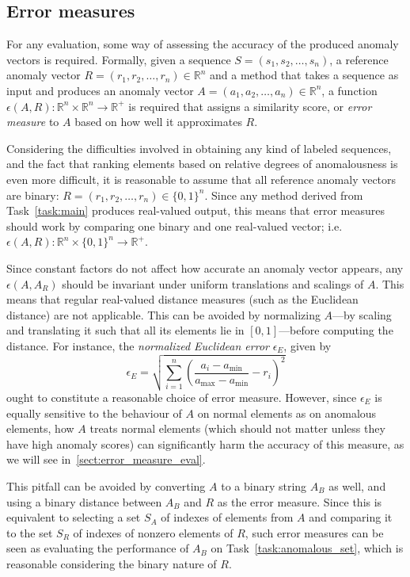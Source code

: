 \subsection{Error measures}
\label{sect:evaluation_measures}

For any evaluation, some way of assessing the accuracy of the produced anomaly vectors is required. Formally, given a sequence $S = (s_1, s_2, \dots, s_n)$, a reference anomaly vector $R = (r_1, r_2, \dots, r_n) \in \mathbb{R}^{n}$ and a method that takes a sequence as input and produces an anomaly vector $A = (a_1, a_2, \dots, a_n) \in \mathbb{R}^{n}$, a function $\epsilon(A, R): \mathbb{R}^n \times \mathbb{R}^n \rightarrow \mathbb{R}^+$ is required that assigns a similarity score, or \emph{error measure} to $A$ based on how well it approximates $R$.

Considering the difficulties involved in obtaining any kind of labeled sequences, and the fact that ranking elements based on relative degrees of anomalousness is even more difficult, it is reasonable to assume that all reference anomaly vectors are binary: $R = (r_1, r_2, \dots, r_n) \in {\{0,1\}}^n$. Since any method derived from Task~\ref{task:main} produces real-valued output, this means that error measures should work by comparing one binary and one real-valued vector; i.e.\ $\epsilon{(A, R)}: \mathbb{R}^{n} \times {\{0,1\}}^n \rightarrow \mathbb{R}^+$.

Since constant factors do not affect how accurate an anomaly vector appears, any $\epsilon(A, A_R)$ should be invariant under uniform translations and scalings of $A$. This means that regular real-valued distance measures (such as the Euclidean distance) are not applicable. This can be avoided by normalizing $A$---by scaling and translating it such that all its elements lie in $[0,1]$---before computing the distance. For instance, the \emph{normalized Euclidean error} $\epsilon_E$, given by
\[
    \epsilon_E = \sqrt{\sum_{i=1}^n {(\frac{a_i-a_{\min}}{a_{\max}-a_{\min}} - r_i)}^2}
\]
ought to constitute a reasonable choice of error measure. However, since $\epsilon_E$ is equally sensitive to the behaviour of $A$ on normal elements as on anomalous elements, how $A$ treats normal elements (which should not matter unless they have high anomaly scores) can significantly harm the accuracy of this measure, as we will see in~\ref{sect:error_measure_eval}. 

This pitfall can be avoided by converting $A$ to a binary string $A_B$ as well, and using a binary distance between $A_B$ and $R$ as the error measure. Since this is equivalent to selecting a set $S_A$ of indexes of elements from $A$ and comparing it to the set $S_R$ of indexes of nonzero elements of $R$, such error measures can be seen as evaluating the performance of $A_B$ on Task~\ref{task:anomalous_set}, which is reasonable considering the binary nature of $R$.

